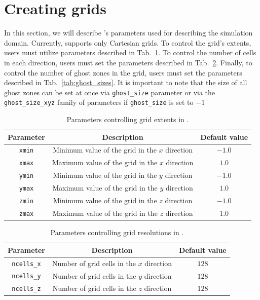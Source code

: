 \section{Creating grids}
\label{sec:grids}

In this section, we will describe \CarpetX's parameters used for describing the simulation domain. Currently, \CarpetX\space supports only Cartesian grids. To control the grid's extents, users must utilize parameters described in Tab.~\ref{tab:grid_sizes}. To control the number of cells in each direction, users must set the parameters described in Tab.~\ref{tab:num_cells}. Finally, to control the number of ghost zones in the grid, users must set the parameters described in Tab.~\ref{tab:ghost_sizes}. It is important to note that the size of all ghost zones can be set at once via \texttt{ghost\_size} parameter or via the \texttt{ghost\_size\_xyz} family of parameters if \texttt{ghost\_size} is set to $-1$

\begin{table}[ht]
  \centering
  \begin{tabular}{ccc}
  Parameter     & Description                                    & Default value \\\hline\hline
  \texttt{xmin} & Minimum value of the grid in the $x$ direction & $-1.0$        \\
  \texttt{xmax} & Maximum value of the grid in the $x$ direction & $1.0$         \\
  \texttt{ymin} & Minimum value of the grid in the $y$ direction & $-1.0$        \\
  \texttt{ymax} & Maximum value of the grid in the $y$ direction & $1.0$         \\
  \texttt{zmin} & Minimum value of the grid in the $z$ direction & $-1.0$        \\
  \texttt{zmax} & Maximum value of the grid in the $z$ direction & $1.0$         \\\hline\hline
  \end{tabular}
  \caption{Parameters controlling grid extents in \CarpetX.}
  \label{tab:grid_sizes}
\end{table}

\begin{table}[ht]
  \centering
  \begin{tabular}{ccc}
  Parameter          & Description                               & Default value \\\hline\hline
  \texttt{ncells\_x} & Number of grid cells in the $x$ direction & $128$         \\
  \texttt{ncells\_y} & Number of grid cells in the $y$ direction & $128$         \\
  \texttt{ncells\_z} & Number of grid cells in the $z$ direction & $128$         \\\hline\hline
  \end{tabular}
  \caption{Parameters controlling grid resolutions in \CarpetX.}
  \label{tab:num_cells}
\end{table}

